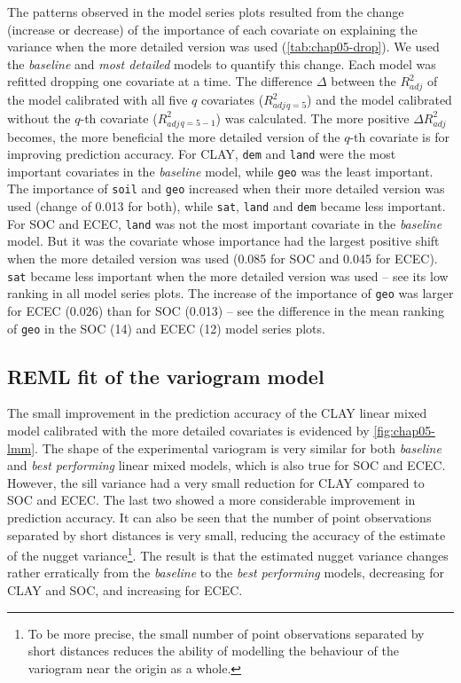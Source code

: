 The patterns observed in the model series plots resulted from the change (increase or decrease) of the 
importance of each covariate on explaining the variance when the more detailed version was used 
(\autoref{tab:chap05-drop}). We used the \emph{baseline} and \emph{most detailed} models to quantify this 
change. Each model was refitted dropping one covariate at a time. The difference $\Delta$ between the 
${R}^{2}_{adj}$ of the model calibrated with all five $q$ covariates (${R}^{2}_{adj}{}_{q = 5}$) and the model 
calibrated without the $q$-th covariate ($R^{2}_{adj}{}_{q = 5 - 1}$) was calculated. The more positive 
$\Delta{R}^{2}_{adj}$ becomes, the more beneficial the more detailed version of the $q$-th covariate is for 
improving prediction accuracy. For CLAY, \texttt{dem} and \texttt{land} were the most important covariates in 
the \emph{baseline} model, while \texttt{geo} was the least important. The importance of \texttt{soil} and 
\texttt{geo} increased when their more detailed version was used (change of \SI{+0.013}{\pp} for both), while 
\texttt{sat}, \texttt{land} and \texttt{dem} became less important. For SOC and ECEC, \texttt{land} was not 
the 
most important covariate in the \emph{baseline} model. But it was the covariate whose importance had the 
largest positive shift when the more detailed version was used (\SI{+0.085}{\pp} for SOC and \SI{+0.045}{\pp}
for ECEC). \texttt{sat} became less important when the more detailed version was used -- see its low ranking 
in 
all model series plots. The increase of the importance of \texttt{geo} was larger for ECEC (\SI{+0.026}{\pp}) 
than for SOC (\SI{+0.013}{\pp}) -- see the difference in the mean ranking of \texttt{geo} in the SOC 
(\num{14}) and ECEC (\num{12}) model series plots.



\subsection{REML fit of the variogram model}

\def\footnugget{\footnote{To be more precise, the small number of point observations separated by short 
distances reduces the ability of modelling the behaviour of the variogram near the origin as a whole.}}

The small improvement in the prediction accuracy of the CLAY linear mixed model calibrated with the more 
detailed covariates is evidenced by \autoref{fig:chap05-lmm}. The shape of the experimental variogram is very 
similar for both \emph{baseline} and \emph{best performing} linear mixed models, which is also true for SOC 
and ECEC. However, the sill variance had a very small reduction for CLAY compared to SOC and ECEC. The last 
two 
showed a more considerable improvement in prediction accuracy. It can also be seen that the number of point 
observations separated by short distances is very small, reducing the accuracy of the estimate of the nugget 
variance\footnugget{}. The result is that the estimated nugget variance changes rather erratically 
from the \emph{baseline} to the \emph{best performing} models, decreasing for CLAY and SOC, and increasing 
for ECEC.

